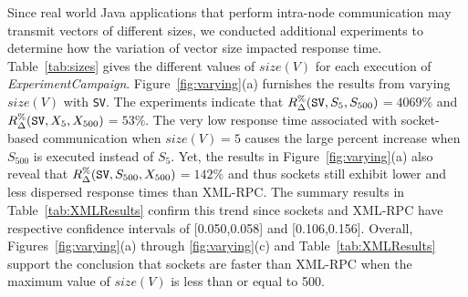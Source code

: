 \documentclass{sig-alternate}
\begin{document}




Since real world Java applications that perform intra-node
communication may transmit vectors of different sizes, we conducted
additional experiments to determine how the variation of vector size
impacted response time.  Table~\ref{tab:sizes} gives the different
values of $size(V)$ for each execution of {\em ExperimentCampaign}.
Figure~\ref{fig:varying}(a) furnishes the results from varying
$size(V)$ with \texttt{SV}. The experiments indicate that {\small
  $R_\Delta^\%(\mbox{{\tt SV}},S_5,S_{500})$}$=4069\%$ and {\small
  $R_\Delta^\%(\mbox{{\tt SV}},X_5,X_{500})$}$=53\%$.  The very low
response time associated with socket-based communication when
$size(V)=5$ causes the large percent increase when $S_{500}$ is
executed instead of $S_{5}$.  Yet, the results in
Figure~\ref{fig:varying}(a) also reveal that {\small
  $R_\Delta^\%(\mbox{{\tt SV}},S_{500},X_{500})$}$=142\%$ and thus
sockets still exhibit lower and less dispersed response times than
XML-RPC.  The summary results in Table~\ref{tab:XMLResults} confirm
this trend since sockets and XML-RPC have respective confidence
intervals of [0.050,0.058] and [0.106,0.156].  Overall,
Figures~\ref{fig:varying}(a) through \ref{fig:varying}(c) and
Table~\ref{tab:XMLResults} support the conclusion that sockets are
faster than XML-RPC when the maximum value of $size(V)$ is less than
or equal to 500.
\end{document}
